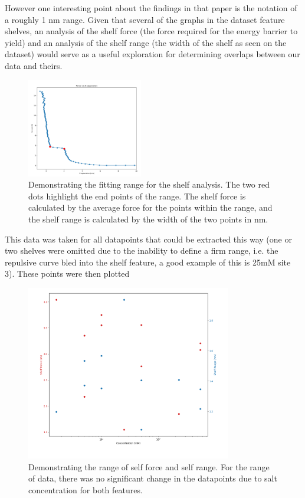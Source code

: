 However one interesting point about the findings in that paper is the notation of a roughly 1 nm range. Given that several of the graphs in the dataset feature shelves, an analysis of the shelf force (the force required for the energy barrier to yield) and an analysis of the shelf range (the width of the shelf as seen on the dataset) would serve as a useful exploration for determining overlaps between our data and theirs.

\begin{figure}[h!]
\centering
\includegraphics[width=0.45\textwidth]{chapter8/Shelf/Force calculatio.png}
\caption{Demonstrating the fitting range for the shelf analysis. The two red dots highlight the end points of the range. The shelf force is calculated by the average force for the points within the range, and the shelf range is calculated by the width of the two points in nm.}
\label{fig:forcecalc}
\end{figure}

This data was taken for all datapoints that could be extracted this way (one or two shelves were omitted due to the inability to define a firm range, i.e. the repulsive curve bled into the shelf feature, a good example of this is 25mM site 3). These points were then plotted

\begin{figure}[h!!]
\centering
\includegraphics[width=0.8\textwidth]{chapter8/Shelf/ShelfScatter.png}
\caption{Demonstrating the range of self force and self range. For the range of data, there was no significant change in the datapoints due to salt concentration for both features.}
\label{fig:resultsShelf}
\end{figure}

